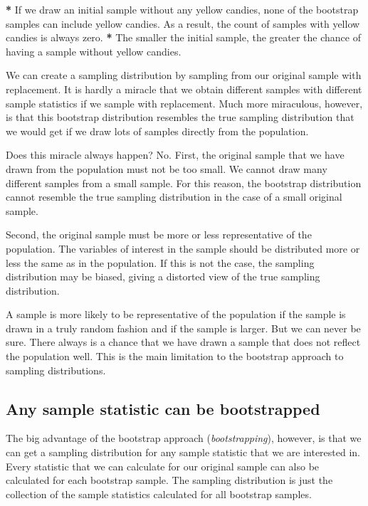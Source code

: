 \documentclass[a4paper]{book}
\newenvironment{Shaded}{\begin{snugshade}}{\end{snugshade}}
\newcommand{\StringTok}[1]{\textcolor[rgb]{0.00,0.00,0.00}{#1}}
\newcommand{\OperatorTok}[1]{\textcolor[rgb]{0.00,0.00,0.00}{\textbf{#1}}}
\newcommand{\NormalTok}[1]{#1}
\theoremstyle{definition}
\theoremstyle{definition}
\theoremstyle{definition}
\theoremstyle{remark}
\begin{document}
\begin{Shaded}
\begin{Highlighting}[]
\OperatorTok{*}\StringTok{ }\NormalTok{If we draw an initial sample without any yellow candies, none of the}
\NormalTok{bootstrap samples can include yellow candies. As a result, the count of}
\NormalTok{samples with yellow candies is always zero.}
\OperatorTok{*}\StringTok{ }\NormalTok{The smaller the initial sample, the greater the chance of having a sample}
\NormalTok{without yellow candies.}
\end{Highlighting}
\end{Shaded}

We can create a sampling distribution by sampling from our original
sample with replacement. It is hardly a miracle that we obtain different
samples with different sample statistics if we sample with replacement.
Much more miraculous, however, is that this bootstrap distribution
resembles the true sampling distribution that we would get if we draw
lots of samples directly from the population.

Does this miracle always happen? No. First, the original sample that we
have drawn from the population must not be too small. We cannot draw
many different samples from a small sample. For this reason, the
bootstrap distribution cannot resemble the true sampling distribution in
the case of a small original sample.

Second, the original sample must be more or less representative of the
population. The variables of interest in the sample should be
distributed more or less the same as in the population. If this is not
the case, the sampling distribution may be biased, giving a distorted
view of the true sampling distribution.

A sample is more likely to be representative of the population if the
sample is drawn in a truly random fashion and if the sample is larger.
But we can never be sure. There always is a chance that we have drawn a
sample that does not reflect the population well. This is the main
limitation to the bootstrap approach to sampling distributions.

\subsection{Any sample statistic can be
bootstrapped}\label{any-sample-statistic-can-be-bootstrapped}

The big advantage of the bootstrap approach (\emph{bootstrapping}),
however, is that we can get a sampling distribution for any sample
statistic that we are interested in. Every statistic that we can
calculate for our original sample can also be calculated for each
bootstrap sample. The sampling distribution is just the collection of
the sample statistics calculated for all bootstrap samples.
\end{document}
